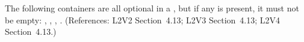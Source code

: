The following containers are all optional in a \Reaction, but if any
is present, it must not be empty: ,
, , .
(References: L2V2 Section~4.13; L2V3 Section~4.13; L2V4 Section~4.13.)
